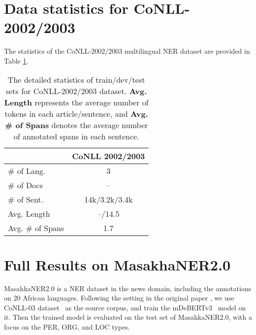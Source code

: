 \documentclass[11pt,dvipsnames]{article}
\begin{document}



\newpage
\appendix

\clearpage








\section{Data statistics for CoNLL-2002/2003}
\label{sec:stat-for-conll0203}
The  statistics of the CoNLL-2002/2003  multilingual NER dataset are provided in Table \ref{table:stat_conll}.  




\renewcommand{\arraystretch}{1.2}
\begin{table}[h!]
\centering
\small
\vspace{-5pt}
\begin{tabular}{lc}
\toprule
& \textbf{CoNLL 2002/2003} \\
\midrule
\# of Lang. & 3 \\ 
\# of Docs & -- \\ 
\# of Sent. & 14k/3.2k/3.4k \\
Avg.  Length & --/14.5\\
Avg.  \# of Spans & 1.7 \\
\bottomrule
\end{tabular}
\caption{The detailed statistics of train/dev/test sets for CoNLL-2002/2003 dataset. \textbf{Avg. Length} represents the average number of tokens in each article/sentence, and \textbf{Avg.  \# of Spans} denotes the average number of annotated spans in each sentence.} 
\vspace{-15pt}
\label{table:stat_conll}
\end{table}

\section{Full Results on MasakhaNER2.0}
\label{sec:results-on-masakha2}

MasahkaNER2.0 is a NER dataset in the news domain, including the annotations on 20 African languages. Following the setting in the original paper \cite{adelani2022masakhaner}, we use CoNLL-03 dataset~\citep{sang2003conll} as the source corpus, and  train the mDeBERTv3~\citep{he2021debertav3} model on it. Then the trained model is evaluated on the test set of  MasahkaNER2.0, with a focus on the PER, ORG, and LOC types. 
\end{document}
